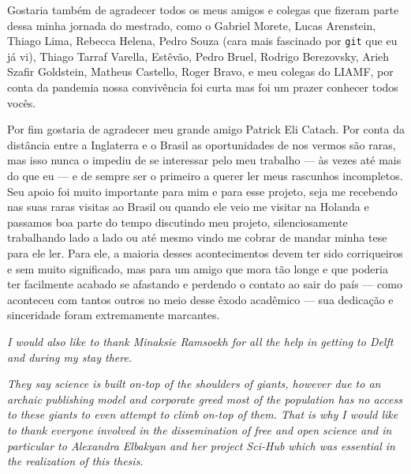 \documentclass[12pt,twoside,brazilian,english]{book}
\begin{document}
Gostaria também de agradecer todos os meus amigos e colegas que fizeram parte dessa minha jornada do mestrado, como o Gabriel Morete, Lucas Arenstein, Thiago Lima, Rebecca Helena, Pedro Souza (cara mais fascinado por \texttt{git} que eu já vi), Thiago Tarraf Varella, Estêvão, Pedro Bruel, Rodrigo Berezovsky, Arieh Szafir Goldstein, Matheus Castello, Roger Bravo, e meu colegas do LIAMF, por conta da pandemia nossa convivência foi curta mas foi um prazer conhecer todos vocês.


Por fim gostaria de agradecer meu grande amigo Patrick Eli Catach. Por conta da distância entre a Inglaterra e o Brasil as oportunidades de nos vermos são raras, mas isso nunca o impediu de se interessar pelo meu trabalho --- às vezes até mais do que eu --- e de sempre ser o primeiro a querer ler meus rascunhos incompletos.
Seu apoio foi muito importante para mim e para esse projeto, seja me recebendo nas suas raras visitas ao Brasil ou quando ele veio me visitar na Holanda e passamos boa parte do tempo discutindo meu projeto, silenciosamente trabalhando lado a lado ou até mesmo vindo me cobrar de mandar minha tese para ele ler. Para ele, a maioria desses acontecimentos devem ter sido corriqueiros e sem muito significado, mas para um amigo que mora tão longe e que poderia ter facilmente acabado se afastando e perdendo o contato ao sair do país --- como aconteceu com tantos outros no meio desse êxodo acadêmico --- sua dedicação e sinceridade foram extremamente marcantes. 

\textit{I would also like to thank Minaksie Ramsoekh for all the help in getting to Delft and during my stay there.}


\textit{They say science is built on-top of the shoulders of giants, however due to an archaic publishing model and corporate greed most of the population has no access to these giants to even attempt to climb on-top of them. That is why I would like to thank everyone involved in the dissemination of free and open science and in particular to Alexandra Elbakyan and her project Sci-Hub which was essential in the realization of this thesis.}






\makeatletter
\if@openright\cleardoublepage\else\clearpage\fi
\makeatother
\end{document}
